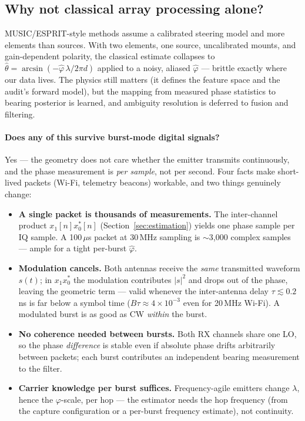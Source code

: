\subsection{Why not classical array processing alone?}

MUSIC/ESPRIT-style methods assume a calibrated steering model and more
elements than sources. With two elements, one source, uncalibrated mounts, and
gain-dependent polarity, the classical estimate collapses to
$\hat\theta = \arcsin(-\hat\varphi\,\lambda/2\pi d)$ applied to a noisy,
aliased $\hat\varphi$ --- brittle exactly where our data lives. The physics
still matters (it defines the feature space and the audit's forward model),
but the mapping from measured phase statistics to bearing posterior is
learned, and ambiguity resolution is deferred to fusion and filtering.

\paragraph{Does any of this survive burst-mode digital signals?}
Yes --- the geometry does not care whether the emitter transmits continuously,
and the phase measurement is \emph{per sample}, not per second. Four facts
make short-lived packets (Wi-Fi, telemetry beacons) workable, and two things
genuinely change:

\begin{itemize}
  \item \textbf{A single packet is thousands of measurements.} The
        inter-channel product $x_1[n]x_0^*[n]$
        (Section~\ref{sec:estimation}) yields one phase sample per IQ sample.
        A 100\,$\mu$s packet at 30\,MHz sampling is $\sim$3{,}000 complex
        samples --- ample for a tight per-burst $\hat\varphi$.
  \item \textbf{Modulation cancels.} Both antennas receive the \emph{same}
        transmitted waveform $s(t)$; in $x_1 x_0^{*}$ the modulation
        contributes $|s|^2$ and drops out of the phase, leaving the geometric
        term --- valid whenever the inter-antenna delay
        $\tau \lesssim 0.2$\,ns is far below a symbol time
        ($B\tau \approx 4\times10^{-3}$ even for 20\,MHz Wi-Fi). A modulated
        burst is as good as CW \emph{within} the burst.
  \item \textbf{No coherence needed between bursts.} Both RX channels share
        one LO, so the phase \emph{difference} is stable even if absolute
        phase drifts arbitrarily between packets; each burst contributes an
        independent bearing measurement to the filter.
  \item \textbf{Carrier knowledge per burst suffices.} Frequency-agile
        emitters change $\lambda$, hence the $\varphi$-scale, per hop --- the
        estimator needs the hop frequency (from the capture configuration or
        a per-burst frequency estimate), not continuity.
\end{itemize}

